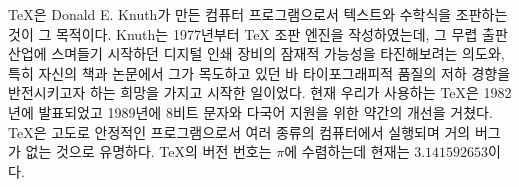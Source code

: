 \TeX 은 Donald E. Knuth가 만든
컴퓨터 프로그램으로서 텍스트와 수학식을 조판하는 것이 그 목적이다\cite{texbook}. Knuth는 1977년부터 \TeX{} 조판 엔진을 
작성하였는데, 그 무렵 출판 산업에 스며들기 시작하던 디지털 인쇄 장비의
잠재적 가능성을 타진해보려는 의도와, 특히 자신의 책과 논문에서 그가 목도하고 있던 바 타이포그래피적 품질의
저하 경향을 반전시키고자 하는 희망을 가지고 시작한 일이었다.
현재 우리가 사용하는 \TeX 은 1982년에 발표되었고 1989년에 8비트 문자와 다국어 지원을 위한 약간의
개선을 거쳤다.
\TeX 은 고도로 안정적인 프로그램으로서 여러 종류의 컴퓨터에서 실행되며 거의 버그가 없는 것으로 유명하다.
\TeX 의 버전 번호는 $\pi$에 수렴하는데 현재는 $3.141592653$이다.

